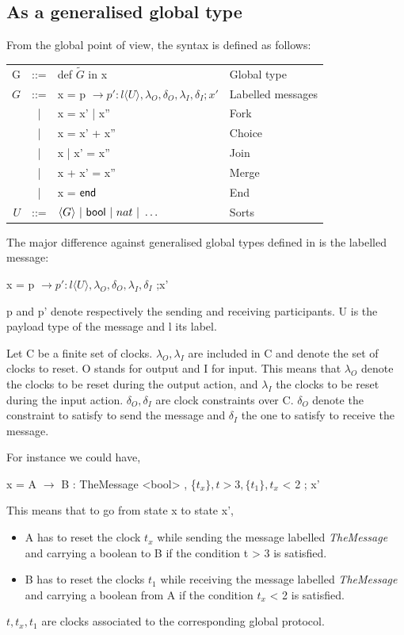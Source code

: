 \documentclass[a4paper,11pt,twoside]{report}
\newcommand{\kf}[1]{\textup{\textsf{#1}}\xspace}
\newcommand{\G}{\ensuremath{G}}
\newcommand{\UT}{\ensuremath{U}}
\newcommand{\End}{\kf{end}}
\newcommand{\Bool}{\kf{bool}}
\begin{document}
\subsection{As a generalised global type}
From the global point of view, the syntax is defined as follows:
\begin{center}
\begin{tabular}{rcll}
G & ::= & def $\tilde{\G}$ in x & Global type \\
$\G$ & ::= & x  = p $\rightarrow p' : l \langle \UT \rangle, \lambda_{O}, \delta_{O}, \lambda_{I}, \delta_{I} ;x' $ & Labelled messages\\
& | & x = x' | x'' & Fork\\
& | & x = x' + x'' & Choice\\
& | & x | x' = x'' & Join\\
& | & x + x' = x'' & Merge\\
& | & x = $\End$ & End\\
\UT & ::= &$ \langle G\rangle\ |\ \Bool\ |\ nat \ |\ \ldots\ $ & Sorts
\end{tabular}
\end{center}
The major difference against generalised global types defined in \cite{denielou2012multiparty} is the labelled message:\begin{center}
x  = p $\rightarrow p' : l \langle \UT \rangle, \lambda_{O}, \delta_{O}, \lambda_{I}, \delta_{I}$ ;x'
\end{center}
p and p' denote respectively the sending and receiving participants. U is the payload type of the message and l its label. 

Let C be a finite set of clocks. $\lambda_{O}, \lambda_{I}$ are included in C and denote the set of clocks to reset. O stands for output and I for input. This means that $\lambda_{O}$ denote the clocks to be reset during the output action, and $\lambda_{I}$ the clocks to be reset during the input action. $\delta_{O}, \delta_{I}$ are clock constraints over C. $\delta_{O}$ denote the constraint to satisfy to send the message and $\delta_{I}$ the one to satisfy to receive the message.

For instance we could have,
\begin{center}
x = A $\rightarrow$ B : TheMessage <bool> , \{$t_{x}\}, t > 3, \{t_1\}, t_{x}$ < 2  ;  x’ 
\end{center}
This means that to go from state x to state x', 
\begin{itemize}
\item A has to reset the clock $t_x$ while sending the message labelled \emph{TheMessage} and carrying a boolean to B if the condition t > 3 is satisfied.
\item B has to reset the clocks $t_1$ while receiving the message labelled \emph{TheMessage} and carrying a boolean from A if the condition $t_x$ < 2 is satisfied.
\end{itemize}
$t, t_x, t_1$ are clocks associated to the corresponding global protocol.
\end{document}
